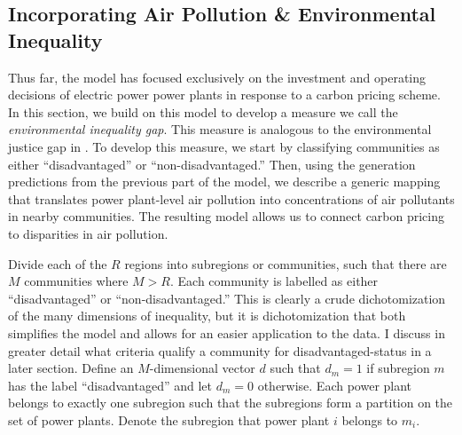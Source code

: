 



\subsection{Incorporating Air Pollution \& Environmental Inequality}

Thus far, the model has focused exclusively on the investment and operating decisions of electric power power plants in response to a carbon pricing scheme. In this section, we build on this model to develop a measure we call the \emph{environmental inequality gap}. This measure is analogous to the environmental justice gap in \cite{hernandez2023environmental}. To develop this measure, we start by classifying communities as either ``disadvantaged'' or ``non-disadvantaged.'' Then, using the generation predictions from the previous part of the model, we describe a generic mapping that translates power plant-level air pollution into concentrations of air pollutants in nearby communities. The resulting model allows us to connect carbon pricing to disparities in air pollution. 

Divide each of the $R$ regions into subregions or communities, such that there are $M$ communities where $M > R$. Each community is labelled as either ``disadvantaged'' or ``non-disadvantaged.'' This is clearly a crude dichotomization of the many dimensions of inequality, but it is dichotomization that both simplifies the model and allows for an easier application to the data. I discuss in greater detail what criteria qualify a community for disadvantaged-status in a later section. Define an $M$-dimensional vector $d$ such that $d_m = 1$ if subregion $m$ has the label ``disadvantaged'' and let $d_m = 0$ otherwise. Each power plant belongs to exactly one subregion such that the subregions form a partition on the set of power plants. Denote the subregion that power plant $i$ belongs to $m_i$.

